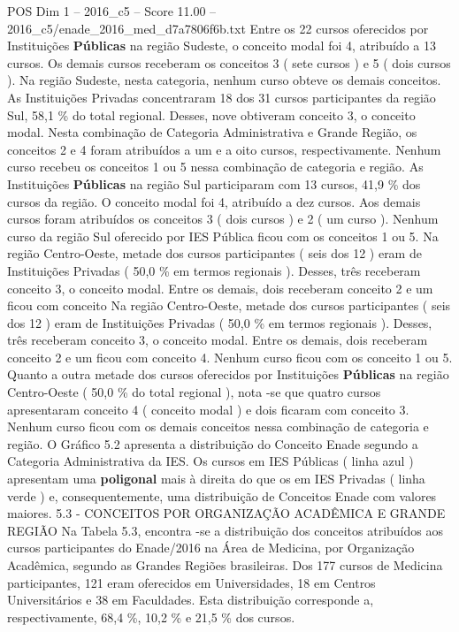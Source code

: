 \begin{textsample}{POS Dim 1 – 2016\_c5 – Score 11.00 – 2016\_c5/enade\_2016\_med\_d7a7806f6b.txt}
Entre os 22 cursos oferecidos por Instituições \textbf{Públicas} na região Sudeste, o conceito modal foi 4, atribuído a 13 cursos.
Os demais cursos receberam os conceitos 3 ( sete cursos ) e 5 ( dois cursos ).
Na região Sudeste, nesta categoria, nenhum curso obteve os demais conceitos.
As Instituições Privadas concentraram 18 dos 31 cursos participantes da região Sul, 58,1 \% do total regional.
Desses, nove obtiveram conceito 3, o conceito modal.
Nesta combinação de Categoria Administrativa e Grande Região, os conceitos 2 e 4 foram atribuídos a um e a oito cursos, respectivamente.
Nenhum curso recebeu os conceitos 1 ou 5 nessa combinação de categoria e região.
As Instituições \textbf{Públicas} na região Sul participaram com 13 cursos, 41,9 \% dos cursos da região.
O conceito modal foi 4, atribuído a dez cursos.
Aos demais cursos foram atribuídos os conceitos 3 ( dois cursos ) e 2 ( um curso ).
Nenhum curso da região Sul oferecido por IES Pública ficou com os conceitos 1 ou 5.
Na região Centro-Oeste, metade dos cursos participantes ( seis dos 12 ) eram de Instituições Privadas ( 50,0 \% em termos regionais ).
Desses, três receberam conceito 3, o conceito modal.
Entre os demais, dois receberam conceito 2 e um ficou com conceito Na região Centro-Oeste, metade dos cursos participantes ( seis dos 12 ) eram de Instituições Privadas ( 50,0 \% em termos regionais ).
Desses, três receberam conceito 3, o conceito modal.
Entre os demais, dois receberam conceito 2 e um ficou com conceito 4.
Nenhum curso ficou com os conceito 1 ou 5.
Quanto a outra metade dos cursos oferecidos por Instituições \textbf{Públicas} na região Centro-Oeste ( 50,0 \% do total regional ), nota -se que quatro cursos apresentaram conceito 4 ( conceito modal ) e dois ficaram com conceito 3.
Nenhum curso ficou com os demais conceitos nessa combinação de categoria e região.
O Gráfico 5.2 apresenta a distribuição do Conceito Enade segundo a Categoria Administrativa da IES.
Os cursos em IES Públicas ( linha azul ) apresentam uma \textbf{poligonal} mais à direita do que os em IES Privadas ( linha verde ) e, consequentemente, uma distribuição de Conceitos Enade com valores maiores. 5.3 - CONCEITOS POR ORGANIZAÇÃO ACADÊMICA E GRANDE REGIÃO Na Tabela 5.3, encontra -se a distribuição dos conceitos atribuídos aos cursos participantes do Enade/2016 na Área de Medicina, por Organização Acadêmica, segundo as Grandes Regiões brasileiras.
Dos 177 cursos de Medicina participantes, 121 eram oferecidos em Universidades, 18 em Centros Universitários e 38 em Faculdades.
Esta distribuição corresponde a, respectivamente, 68,4 \%, 10,2 \% e 21,5 \% dos cursos.

\end{textsample}
